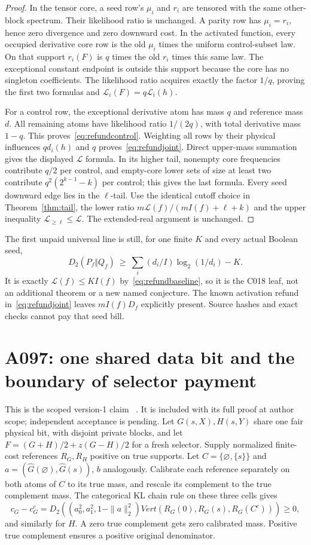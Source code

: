 \begin{proof}
In the tensor core, a seed row's $\mu_i$ and $r_i$ are tensored with
the same other-block spectrum. Their likelihood ratio is unchanged.
A parity row has $\mu_i=r_i$, hence zero divergence and zero downward cost.
In the activated function, every occupied derivative core row is the
old $\mu_i$ times the uniform control-subset law. On that support
$r_i(F)$ is $q$ times the old $r_i$ times this same law. The exceptional
constant endpoint is outside this support because the core has no singleton
coefficients. The likelihood ratio acquires exactly the factor $1/q$,
proving the first two formulas and $\mathcal L_i(F)=q\mathcal L_i(h)$.

For a control row, the exceptional derivative atom has mass $q$ and
reference mass $d$. All remaining atoms have likelihood ratio $1/(2q)$,
with total derivative mass $1-q$. This proves~\eqref{eq:refundcontrol}.
Weighting all rows by their physical influences $qd_i(h)$ and $q$
proves~\eqref{eq:refundjoint}. Direct upper-mass summation gives
the displayed $\mathcal L$ formula. In its higher tail, nonempty core
frequencies contribute $q/2$ per control, and empty-core lower sets of
size at least two contribute $q^2(2^{k-1}-k)$ per control; this gives
the last formula. Every seed downward edge lies in the $\ell$-tail.
Use the identical cutoff choice in Theorem~\ref{thm:tail}, the lower
ratio $m\mathcal L(f)/(mI(f)+\ell+k)$ and the upper inequality
$\mathcal L_{\ge\ell}\le\mathcal L$. The extended-real argument is unchanged.
\end{proof}
The first unpaid universal line is still, for one finite $K$ and every
actual Boolean seed,
\[
 D_2(P_f\Vert Q_f)\ \ge\ \sum_i(d_i/I)\log_2(1/d_i)-K.
\]
It is exactly $\mathcal L(f)\le KI(f)$ by~\eqref{eq:refundbaseline},
so it is the C018 leaf, not an additional theorem or a new named conjecture.
The known activation refund in~\eqref{eq:refundjoint} leaves $mI(f)D_f$
explicitly present. Source hashes and exact checks cannot pay that seed bill.

\section{A097: one shared data bit and the boundary of selector payment}
\label{sec:shared}
This is the scoped version-1 claim
~\cite{A097c}.
It is included with its full proof at author scope; independent
acceptance is pending. Let $G(s,X),H(s,Y)$ share one fair physical bit,
with disjoint private blocks, and let $F=(G+H)/2+z(G-H)/2$ for a fresh selector.
Supply normalized finite-cost references $R_G,R_H$ positive on true supports.
Let $C=\{\varnothing,\{s\}\}$ and
$a=(\widehat G(\varnothing),\widehat G(s))$, $b$ analogously.
Calibrate each reference separately on both atoms of $C$ to its true
mass, and rescale its complement to the true complement mass.
The categorical KL chain rule on these three cells gives
\[
 c_G-c_G^c=D_2((a_0^2,a_1^2,1-\|a\|_2^2)Vert
          (R_G(0),R_G(s),R_G(C^c)))\ge0,
\]
and similarly for $H$. A zero true complement gets zero calibrated mass.
Positive true complement ensures a positive original denominator.

